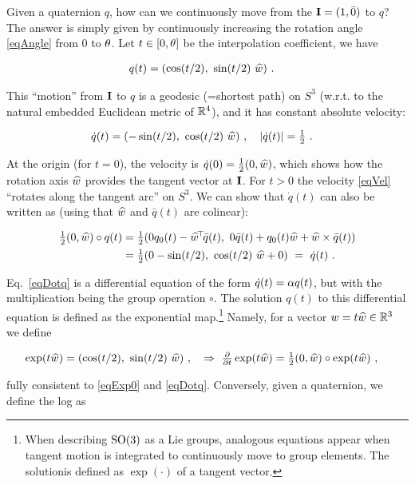 Given a quaternion $q$, how can we continuously move from the ${\rm\bf I}=(1,\bar
0)$ to $q$? The answer is simply given by continuously increasing the
rotation angle \eqref{eqAngle} from $0$ to $\theta$. Let $t\in[0,\theta]$ be
the interpolation coefficient, we have

\begin{align}
q(t)
&= (\cos(t/2),~ \sin(t/2)~ \widehat w) ~. \label{eqExp0}
\end{align}

This ``motion'' from ${\rm\bf I}$ to $q$ is a geodesic (=shortest path) on
$S^3$ (w.r.t. to the natural embedded Euclidean metric of ${\mathbb{R}}^4$),
and it has constant absolute velocity:

\begin{align}\label{eqVel}
\dot q(t)
&= (-\sin(t/2),~ \cos(t/2)~ \widehat w)~,\quad
|\dot q(t)| = \textstyle\frac12 ~.
\end{align}

At the origin (for $t=0$), the velocity is
$\dot q(0) = \textstyle\frac12 (0, \widehat w)$, which shows
 how the rotation axis $\widehat w$ provides the tangent vector at
${\rm\bf I}$. For $t>0$ the velocity \eqref{eqVel}
``rotates along the tangent arc'' on $S^3$. We can show that $\dot q(t)$
can also be written as (using that $\widehat w$ and $\bar q(t)$ are colinear):

\begin{align}
\textstyle\frac12 (0, \widehat w) \circ q(t)
&= \textstyle\frac12 (0 q_0(t) - \widehat w^{\!\top\!} \bar q(t),~ 0 \bar q(t) + q_0(t) \widehat w + \widehat w \times \bar q(t)) \\
&= \textstyle\frac12 (0 - \sin(t/2),~ \cos(t/2)~ \widehat w + 0) ~=~ \dot q(t) ~.  \label{eqDotq}
\end{align}

Eq.~\eqref{eqDotq} is a differential equation of the form $\dot q(t)
= \alpha q(t)$, but with the multiplication being the group operation $\circ$. The solution
$q(t)$ to this differential equation is defined as the exponential map.\footnote{When describing $\text{SO}(3)$ as a Lie groups,
analogous equations appear when tangent motion is integrated to
continuously move to group elements. The solutionis defined as
$\exp(\cdot)$ of a tangent vector.} Namely, for a vector $w=t\widehat w \in
{\mathbb{R}}^3$ we define

\begin{align}
\exp(t \widehat w)
&= (\cos(t/2),~ \sin(t/2)~ \widehat w) ~,\quad
\Rightarrow~ \textstyle\frac{\partial}{\partial t} \exp(t \widehat w)
 = \textstyle\frac12 (0, \widehat w) \circ \exp(t \widehat w) ~,
\end{align}

fully consistent to \eqref{eqExp0} and \eqref{eqDotq}. Conversely, given a quaternion, we define the log as

